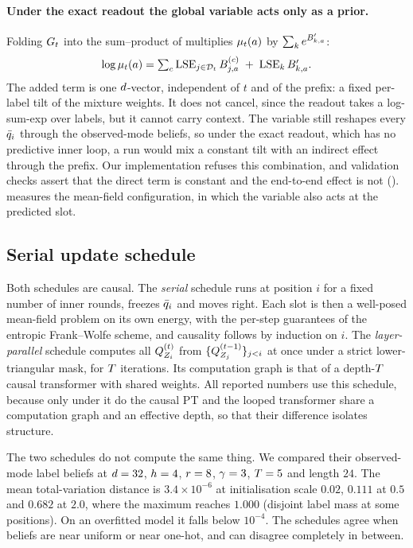 \paragraph{Under the exact readout the global variable acts only as a prior.}
Folding $G_{t}$ into the sum--product of  multiplies $\mu_{t}(a)$
by $\sum_k e^{B'_{k,a}}$:
%
\begin{equation}
\label{eq:global-readout}
  \log \mu_{t}(a) = \textstyle\sum_{c} \operatorname*{LSE}_{j \in \mathcal{D}_{t}} B^{(c)}_{j,a}
    \;+\; \operatorname*{LSE}_{k} B'_{k,a}.
\end{equation}
%
The added term is one $d$-vector, independent of $t$ and of the prefix: a fixed per-label
tilt of the mixture weights. It does not cancel, since the readout takes a log-sum-exp over
labels, but it cannot carry context. The variable still reshapes every $\bar{q}_{i}$ through the
observed-mode beliefs, so under the exact readout, which has no predictive inner loop, a run would mix
a constant tilt with an indirect effect through the prefix. Our implementation refuses this
combination, and validation checks assert that the direct term is constant and the end-to-end
effect is not ().  measures the mean-field
configuration, in which the variable also acts at the predicted slot.

\subsection{Serial update schedule}
\label{app:serial}

Both schedules are causal. The \emph{serial} schedule runs  at
position $i$ for a fixed number of inner rounds, freezes $\bar{q}_{i}$ and moves right. Each slot
is then a well-posed mean-field problem on its own energy, with the per-step guarantees of the
entropic Frank--Wolfe scheme, and causality follows by induction on $i$. The
\emph{layer-parallel} schedule computes all $Q_{Z_{i}}^{(t)}$ from $\{Q_{Z_{j}}^{(t-1)}\}_{j<i}$ at
once under a strict lower-triangular mask, for $T$ iterations. Its computation graph is
that of a depth-$T$ causal transformer with shared weights. All reported numbers use this
schedule, because only under it do the causal PT and the looped transformer share a computation
graph and an effective depth, so that their difference isolates structure.

The two schedules do not compute the same thing. We compared their observed-mode label beliefs at $d=32$, $h=4$, $r=8$, $\gamma=3$, $T=5$ and length $24$. The mean
total-variation distance is $3.4\times10^{-6}$ at initialisation scale $0.02$, $0.111$ at
$0.5$ and $0.682$ at $2.0$, where the maximum reaches $1.000$ (disjoint label mass at some
positions). On an overfitted model it falls below $10^{-4}$. The schedules agree when beliefs
are near uniform or near one-hot, and can disagree completely in between.

